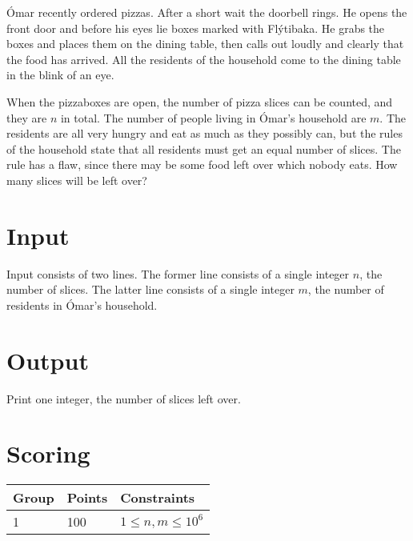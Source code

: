 
Ómar recently ordered pizzas.
After a short wait the doorbell rings.
He opens the front door and before his eyes lie boxes marked with Flýtibaka.
He grabs the boxes and places them on the dining table, then calls out loudly and clearly that the food has arrived.
All the residents of the household come to the dining table in the blink of an eye.

When the pizzaboxes are open, the number of pizza slices can be counted, and they are $n$ in total.
The number of people living in Ómar's household are $m$.
The residents are all very hungry and eat as much as they possibly can, but the rules of the household state that all residents must get an equal number of slices.
The rule has a flaw, since there may be some food left over which nobody eats.
How many slices will be left over?

\section*{Input}
Input consists of two lines.
The former line consists of a single integer $n$, the number of slices.
The latter line consists of a single integer $m$, the number of residents in Ómar's household.

\section*{Output}
Print one integer, the number of slices left over.

\section*{Scoring}
\begin{tabular}{|l|l|l|}
\hline
Group & Points & Constraints \\ \hline
1     & 100    & $1 \leq n, m \leq 10^6$ \\ \hline
\end{tabular}
